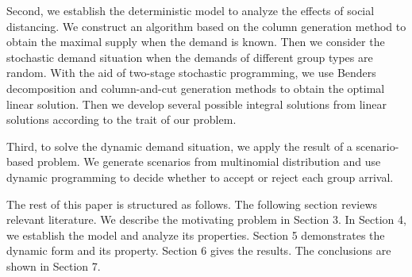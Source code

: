 Second, we establish the deterministic model to analyze the effects of social distancing. We construct an algorithm based on the column generation method to obtain the maximal supply when the demand is known. Then we consider the stochastic demand situation when the demands of different group types are random. With the aid of two-stage stochastic programming, we use Benders decomposition and column-and-cut generation methods to obtain the optimal linear solution. Then we develop several possible integral solutions from linear solutions according to the trait of our problem.


Third, to solve the dynamic demand situation, we apply the result of a scenario-based problem. We generate scenarios from multinomial distribution and use dynamic programming to decide whether to accept or reject each group arrival.




The rest of this paper is structured as follows. The following section reviews relevant literature. We describe the motivating problem in Section 3. In Section 4, we establish the model and analyze its properties. Section 5 demonstrates the dynamic form and its property. Section 6 gives the results. The conclusions are shown in Section 7.

\newpage
